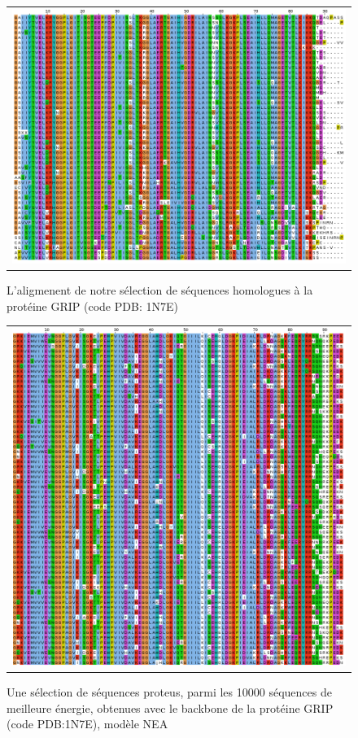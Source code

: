    \begin{figure}[t]
     \centering
     \begin{tabular}{c}
       \includegraphics[width=17cm]{homologues/1N7E.png} \\
     \end{tabular}
     \caption{L'aligmenent de notre sélection de séquences homologues à la protéine GRIP (code PDB: 1N7E)}
\label{align_homo:GRIP}
   \end{figure}

   \begin{figure}[t]
     \centering
     \begin{tabular}{c}
       \includegraphics[width=17cm]{proteus/1N7E.png} \\
     \end{tabular}
       \caption{Une sélection de séquences proteus, parmi les 10000 séquences de meilleure énergie, obtenues avec le backbone de la protéine GRIP (code PDB:1N7E), modèle NEA}
\label{align_proteus:GRIP}
   \end{figure}
\clearpage

